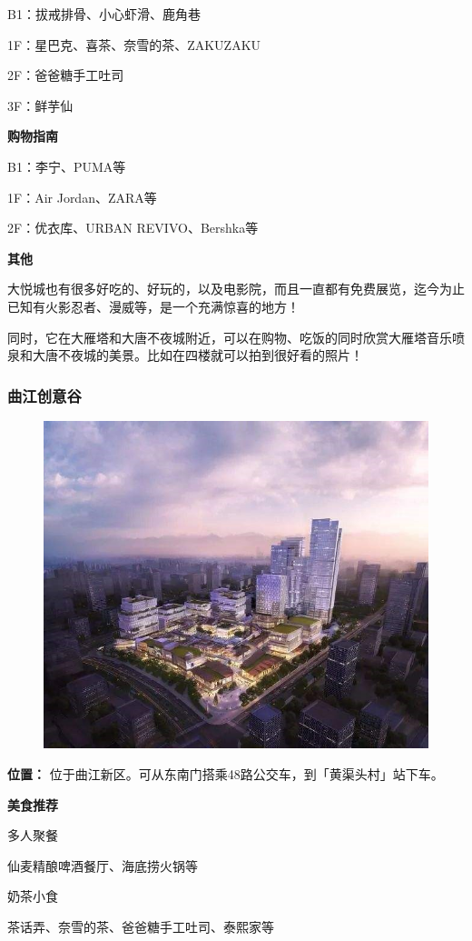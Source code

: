 \documentclass[
decoration,  %
]{qyxf-book}
\begin{document}
B1：拔戒排骨、小心虾滑、鹿角巷

1F：星巴克、喜茶、奈雪的茶、ZAKUZAKU

2F：爸爸糖手工吐司

3F：鲜芋仙


\textbf{购物指南}

B1：李宁、PUMA等

1F：Air Jordan、ZARA等

2F：优衣库、URBAN REVIVO、Bershka等


\textbf{其他}

大悦城也有很多好吃的、好玩的，以及电影院，而且一直都有免费展览，迄今为止已知有火影忍者、漫威等，是一个充满惊喜的地方！

同时，它在大雁塔和大唐不夜城附近，可以在购物、吃饭的同时欣赏大雁塔音乐喷泉和大唐不夜城的美景。比如在四楼就可以拍到很好看的照片！


\subsubsection{曲江创意谷}


\begin{figure}[htbp]
	\centering
	\includegraphics[width=0.8\linewidth]{pics/image24.jpg}
\end{figure}

\textbf{位置：}
位于曲江新区。可从东南门搭乘48路公交车，到「黄渠头村」站下车。

\textbf{美食推荐}

多人聚餐

仙麦精酿啤酒餐厅、海底捞火锅等

奶茶小食

茶话弄、奈雪的茶、爸爸糖手工吐司、泰熙家等
\end{document}
